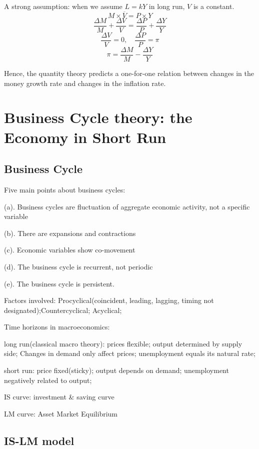 \documentclass[10pt, a4paper]{article}
\begin{document}
        A strong assumption: when we assume $L = kY$ in long run, $V$ is a constant. 
        $$M \times \overline{V} = P \times Y$$
        $$\frac{\Delta M}{M} + \frac{\Delta V}{V} = \frac{\Delta P}{P} + \frac{\Delta Y}{Y}$$
        $$\frac{\Delta V}{V} = 0, \quad \frac{\Delta P}{P} = \pi$$
        $$\pi = \frac{\Delta M}{M} - \frac{\Delta Y}{Y}$$

        Hence, the quantity theory predicts a one-for-one relation between changes in the money growth rate and changes in the inflation rate. 
\newpage
\section{Business Cycle theory: the Economy in Short Run}
    \subsection{Business Cycle}
        Five main points about business cycles: 

        \quad (a). Business cycles are fluctuation of aggregate economic activity, not a specific variable 

        \quad (b). There are expansions and contractions 

        \quad (c). Economic variables show co-movement

        \quad (d). The business cycle is recurrent, not periodic

        \quad (e). The business cycle is persistent. 
    

        Factors involved: Procyclical(coincident, leading, lagging, timing not designated);Countercyclical; Acyclical; 
            
        Time horizons in macroeconomics: 
        
        \quad long run(classical macro theory): prices flexible; output determined by supply side; Changes in demand only affect prices; unemployment equals its natural rate; 

        \quad short run: price fixed(sticky); output depends on demand; unemployment negatively related to output; 

        \medskip

        IS curve: investment \& saving curve 

        LM curve: Asset Market Equilibrium

        \subsection{IS-LM model} 
\end{document}
